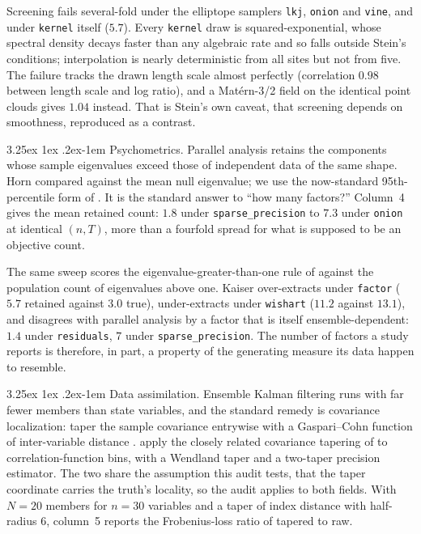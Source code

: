 \documentclass[11pt]{article}
\makeatletter
\renewcommand\paragraph{\@startsection{paragraph}{4}{\z@}%
  {3.25ex \@plus1ex \@minus.2ex}{-1em}%
  {\normalfont\normalsize\itshape}}
\renewcommand\paragraph{\@startsection{paragraph}{4}{\z@}%
  {3.25ex \@plus1ex \@minus.2ex}{-1em}%
  {\normalfont\normalsize\itshape}}
\makeatother
\begin{document}
Screening fails several-fold under the elliptope samplers \texttt{lkj},
\texttt{onion} and \texttt{vine}, and under \texttt{kernel} itself ($5.7$).
Every \texttt{kernel} draw is squared-exponential, whose spectral density
decays faster than any algebraic rate and so falls outside Stein's
conditions; interpolation is nearly deterministic from all sites but not
from five. The failure tracks the drawn length scale almost perfectly
(correlation $0.98$ between length scale and log ratio), and a Mat\'ern-3/2
field on the identical point clouds gives $1.04$ instead. That is Stein's
own caveat, that screening depends on smoothness, reproduced as a
contrast.

\paragraph{Psychometrics.} Parallel analysis \citep{horn1965} retains the components whose sample
eigenvalues exceed those of independent data of the same shape. Horn
compared against the mean null eigenvalue; we use the now-standard
95th-percentile form of \citet{glorfeld1995}. It is the standard answer
to ``how many factors?'' Column~4 gives the mean retained count: $1.8$
under \texttt{sparse\_precision} to $7.3$ under \texttt{onion} at
identical $(n,T)$, more than a fourfold spread for what is supposed to be
an objective count.

The same sweep scores the eigenvalue-greater-than-one rule of \citet{kaiser1960} against the population count of
eigenvalues above one. Kaiser over-extracts under \texttt{factor} ($5.7$
retained against $3.0$ true), under-extracts under \texttt{wishart}
($11.2$ against $13.1$), and disagrees with parallel analysis by a factor
that is itself ensemble-dependent: $1.4$ under \texttt{residuals}, $7$
under \texttt{sparse\_precision}. The number of factors a study reports is
therefore, in part, a property of the generating measure its data happen
to resemble.

\paragraph{Data assimilation.} Ensemble Kalman filtering runs with far
fewer members than state variables, and the standard remedy is covariance
localization: taper the sample covariance entrywise with a Gaspari--Cohn
function \citep{gaspari1999} of inter-variable distance
\citep{houtekamer2001,hamill2001}. \citet{paz2015} apply the closely
related covariance tapering of \citet{kaufman2008} to correlation-function
bins, with a Wendland taper and a two-taper precision estimator. The two
share the assumption this audit tests, that the taper coordinate carries
the truth's locality, so the audit applies to both fields. With $N=20$
members for $n=30$ variables and a taper of index distance with
half-radius $6$, column~5 reports the Frobenius-loss ratio of tapered to
raw.
\end{document}

